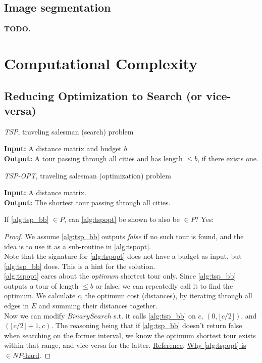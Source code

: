 \documentclass{article}
\theoremstyle{definition}
\begin{document}
\subsection{Image segmentation}
\textbf{TODO.}

\section{Computational Complexity}
\subsection{Reducing Optimization to Search (or vice-versa)}
\begin{algorithm}
	\caption{\textit{TSP}, traveling salesman (search) problem}
	\label{alg:tsp_bb}
	\hspace*{\algorithmicindent} \textbf{Input:} A distance matrix and budget $b$.\\
	\hspace*{\algorithmicindent} \textbf{Output:} A tour passing through all cities and has length $\leq b$, if there exists one.
\end{algorithm}
\begin{algorithm}
	\caption{\textit{TSP-OPT}, traveling salesman (optimization) problem}
	\label{alg:tspopt}
	\hspace*{\algorithmicindent} \textbf{Input:} A distance matrix.\\
	\hspace*{\algorithmicindent} \textbf{Output:} The shortest tour passing through all cities.
\end{algorithm}

If \ref{alg:tsp_bb} $\in P$, can \ref{alg:tspopt} be shown to also be $\in P$? Yes:

\begin{proof}
	We assume \ref{alg:tsp_bb} outputs \textit{false} if no such tour is found, and the idea is to use it as a sub-routine in \ref{alg:tspopt}.\\
	Note that the signature for \ref{alg:tspopt} does not have a budget as input, but \ref{alg:tsp_bb} does. This is a hint for the solution.\\
	\ref{alg:tspopt} cares about the \textit{optimum} shortest tour only. Since \ref{alg:tsp_bb} outputs a tour of length $\leq b$ or false, we can repeatedly call it to find the optimum.
	We calculate $c$, the optimum cost (distances), by iterating through all edges in $E$ and summing their distances together.\\
	Now we can modify $BinarySearch$ s.t. it calls \ref{alg:tsp_bb} on $c$, $(0, \lfloor c/2 \rfloor)$, and $(\lfloor c/2 \rfloor +1, c)$. The reasoning being that if \ref{alg:tsp_bb} doesn't return false when searching on the former interval, we know the optimum shortest tour exists within that range, and vice-versa for the latter. \href{https://cseweb.ucsd.edu/classes/sp08/cse101/hw/hw6soln.pdf}{Reference}. \href{https://eklitzke.org/the-traveling-salesman-problem-is-not-np-complete}{Why \ref{alg:tspopt} is $\in NP$-hard}.
\end{proof}
\end{document}
